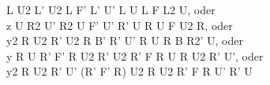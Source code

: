 L U2 L' U2 L F' L' U' L U L F L2 U, oder\\
z U R2 U' R2 U F' U' R' U R U F U2 R, oder\\
y2 R U2 R' U2 R B' R' U' R U R B R2' U, oder\\
y R U R' F' R U2 R' U2 R' F R U R U2 R' U', oder\\
y2 R U2 R' U' (R' F' R) U2 R U2 R' F R U' R' U\\
